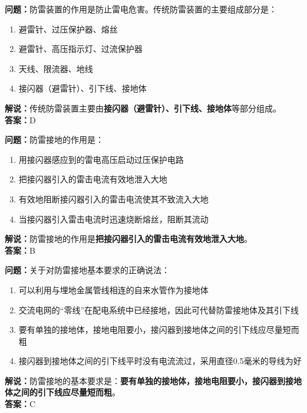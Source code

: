 \textbf{问题：}防雷装置的作用是防止雷电危害。传统防雷装置的主要组成部分是：

\begin{enumerate}[label=\Alph*), leftmargin=1.5cm]
	\item 避雷针、过压保护器、熔丝
	\item 避雷针、高压指示灯、过流保护器
	\item 天线、限流器、地线
	\item 接闪器（避雷针）、引下线、接地体
\end{enumerate}

\textbf{解说：}传统防雷装置主要由\textbf{接闪器（避雷针）、引下线、接地体}等部分组成。\\\textbf{答案：}D


\textbf{问题：}防雷接地的作用是：

\begin{enumerate}[label=\Alph*), leftmargin=1.5cm]
	\item 用接闪器感应到的雷电高压启动过压保护电路
	\item 把接闪器引入的雷击电流有效地泄入大地
	\item 有效地阻断接闪器引入的雷击电流使其不致流入大地
	\item 当接闪器引入雷击电流时迅速烧断熔丝，阻断其流动
\end{enumerate}

\textbf{解说：}防雷接地的作用是\textbf{把接闪器引入的雷击电流有效地泄入大地}。\\\textbf{答案：}B



\textbf{问题：}关于对防雷接地基本要求的正确说法：

\begin{enumerate}[label=\Alph*), leftmargin=1.5cm]
	\item 可以利用与埋地金属管线相连的自来水管作为接地体
	\item 交流电网的“零线”在配电系统中已经接地，因此可代替防雷接地体及其引下线
	\item 要有单独的接地体，接地电阻要小，接闪器到接地体之间的引下线应尽量短而粗
	\item 接闪器到接地体之间的引下线平时没有电流流过，采用直径0.5毫米的导线为好
\end{enumerate}

\textbf{解说：}防雷接地的基本要求是：\textbf{要有单独的接地体，接地电阻要小，接闪器到接地体之间的引下线应尽量短而粗}。\\\textbf{答案：}C%




